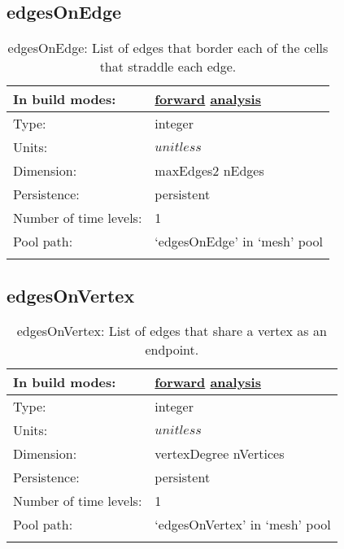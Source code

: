 \subsection[edgesOnEdge]{edgesOnEdge}
\label{subsec:var_sec_mesh_edgesOnEdge}
\begin{center}
\begin{longtable}{| p{2.0in} | p{4.0in} |}
        \hline 
        In build modes: & \hyperref[subsec:forward_var_tab_mesh]{forward} \hyperref[subsec:analysis_var_tab_mesh]{analysis} \\
        \hline 
        Type: & integer \\
        \hline 
        Units: & $unitless$ \\
        \hline 
        Dimension: & maxEdges2 nEdges \\
        \hline 
        Persistence: & persistent \\
        \hline 
        Number of time levels: & 1 \\
        \hline 
            Pool path: & `edgesOnEdge' in `mesh' pool \\
		 \hline 
    \caption{edgesOnEdge: List of edges that border each of the cells that straddle each edge.}
\end{longtable}
\end{center}
\subsection[edgesOnVertex]{edgesOnVertex}
\label{subsec:var_sec_mesh_edgesOnVertex}
\begin{center}
\begin{longtable}{| p{2.0in} | p{4.0in} |}
        \hline 
        In build modes: & \hyperref[subsec:forward_var_tab_mesh]{forward} \hyperref[subsec:analysis_var_tab_mesh]{analysis} \\
        \hline 
        Type: & integer \\
        \hline 
        Units: & $unitless$ \\
        \hline 
        Dimension: & vertexDegree nVertices \\
        \hline 
        Persistence: & persistent \\
        \hline 
        Number of time levels: & 1 \\
        \hline 
            Pool path: & `edgesOnVertex' in `mesh' pool \\
		 \hline 
    \caption{edgesOnVertex: List of edges that share a vertex as an endpoint.}
\end{longtable}
\end{center}

